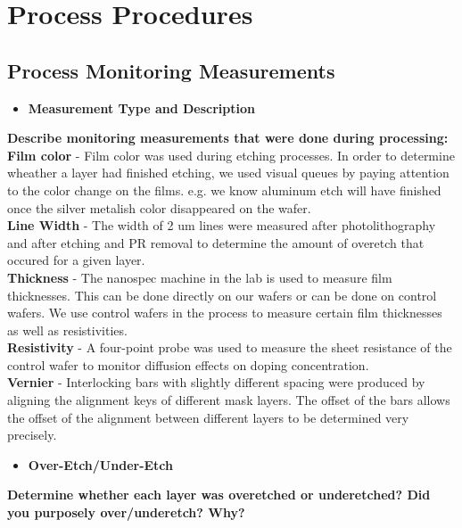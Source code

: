 \documentclass{article}
\begin{document}
\section{Process Procedures}
\subsection{Process Monitoring Measurements}
\begin{itemize}
\item \textbf{Measurement Type and Description}
\end{itemize}
\textbf{Describe monitoring measurements that were done during processing:} \\

\textbf{Film color} - 
Film color was used during etching processes. In order to determine wheather a layer had finished etching, we used visual queues by paying attention to the color change on the films. e.g. we know aluminum etch will have finished once the silver metalish color disappeared on the wafer. \\
 
\textbf{Line Width} - 
The width of 2 um lines were measured after photolithography and after etching and PR removal to determine the amount of overetch that occured for a given layer. \\

\textbf{Thickness} -
The nanospec machine in the lab is used to measure film thicknesses. This can be done directly on our wafers or can be done on control wafers. We use control wafers in the process to measure certain film thicknesses as well as resistivities. \\

\textbf{Resistivity} - 
A four-point probe was used to measure the sheet resistance of the control wafer to monitor diffusion effects on doping concentration. \\

\textbf{Vernier} - 
Interlocking bars with slightly different spacing were produced by aligning the alignment keys of different mask layers. The offset of the bars allows the offset of the alignment between different layers to be determined very precisely.

\begin{itemize}
\item \textbf{Over-Etch/Under-Etch}
\end{itemize}
\textbf{Determine whether each layer was overetched or underetched? Did you purposely
over/underetch? Why?} \\
\end{document}

